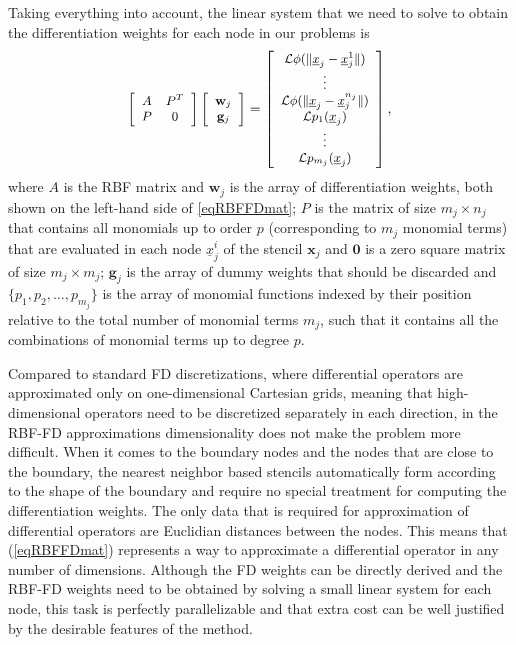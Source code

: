 \documentclass{UUThesisTemplate}
\begin{document}
%
\par
Taking everything into account, the linear system that we need to solve to obtain the differentiation weights for each node in our problems is
\begin{equation}
{\footnotesize{
\label{eq:D2}
\left[\begin{array}{cc}
A & P^T \\
P & 0 \\
\end{array}\right]
\left[\begin{array}{c}
{\mathbf{w}}_j\\
{\mathbf{g}}_j\\
\end{array}\right]=
\left[\begin{array}{c}
\mathcal{L}\phi(\|\underline{x}_{j}-\underline{x}_j^{1}\|)\\
\vdots \\
\mathcal{L}\phi(\|\underline{x}_{j}-\underline{x}_j^{n_j}\|)\\
\mathcal{L}p_1(\underline{x}_j)\\
\vdots\\
\mathcal{L}p_{m_j}(\underline{x}_j)
\end{array}\right],
}}
\end{equation}
where $A$ is the RBF matrix and $\mathbf{w}_j$ is the array of differentiation weights, both shown on the left-hand side of \eqref{eqRBFFDmat}; $P$ is the matrix of size $m_j \times n_j$ that contains all monomials up to order $p$ (corresponding to $m_j$ monomial terms) that are evaluated in each node $\underline{x}_j^i$ of the stencil $\mathbf{x}_j$ and $\mathbf{0}$ is a zero square matrix of size $m_j \times m_j$; $\mathbf{g}_j$ is the array of dummy weights that should be discarded and $\{p_1, p_2, \ldots, p_{m_j}\}$ is the array of monomial functions indexed by their position relative to the total number of monomial terms $m_j$, such that it contains all the combinations of monomial terms up to degree $p$.
\par
Compared to standard FD discretizations, where differential operators are approximated only on one-dimensional Cartesian grids, meaning that high-dimensional operators need to be discretized separately in each direction, in the RBF-FD approximations dimensionality does not make the problem more difficult. When it comes to the boundary nodes and the nodes that are close to the boundary, the nearest neighbor based stencils automatically form according to the shape of the boundary and require no special treatment for computing the differentiation weights. The only data that is required for approximation of differential operators are Euclidian distances between the nodes. This means that (\ref{eqRBFFDmat}) represents a way to approximate a differential operator in any number of dimensions. Although the FD weights can be directly derived and the RBF-FD weights need to be obtained by solving a small linear system for each node, this task is perfectly parallelizable and that extra cost can be well justified by the desirable features of the method.
\end{document}
